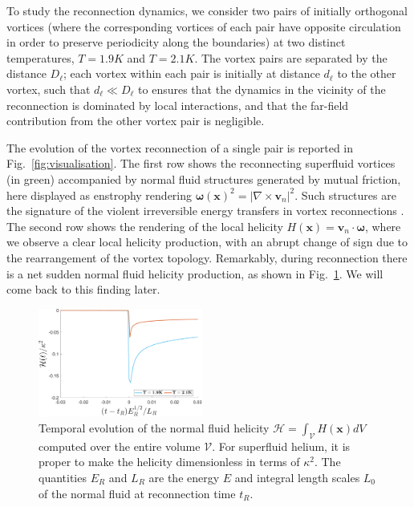 \documentclass[%
 reprint,
 amsmath,amssymb,
 aps,
 prl,
]{revtex4-2}
\newcommand{\bom}{\boldsymbol{\omega}}
\def \v{\mathbf{v}}
\def \x{\mathbf{x}}
\begin{document}
{To study the reconnection dynamics, we consider two pairs of initially orthogonal vortices (where the corresponding vortices of each pair have opposite circulation in order to preserve periodicity along the boundaries)
at two distinct temperatures, $T=1.9K$ and $T=2.1K$. The vortex pairs are separated by the distance $D_{\ell}$; each vortex within each pair is initially at distance $d_{\ell}$ to the other vortex, such that $d_{\ell}\ll D_{\ell}$ to ensures that the dynamics in the vicinity of the reconnection is dominated by local interactions, and that the far-field contribution from the other vortex pair is negligible.

The evolution of the vortex reconnection of a single pair is reported in Fig.~\ref{fig:visualisation}. 
The first row shows the reconnecting superfluid vortices (in green) accompanied by normal fluid structures generated by mutual friction, here displayed as enstrophy rendering $\bom(\x)^2=|\nabla\times \v_n|^2$. Such structures are the signature of the violent irreversible energy transfers in vortex reconnections 
\cite{stasiak2024quantum}. The second row shows the rendering of the local helicity $H(\x)=\v_n\cdot\bom$, where we observe a clear local helicity production, with an abrupt change of sign due to the rearrangement of the vortex topology. Remarkably, during reconnection there is a net 
sudden normal fluid helicity production, as shown in Fig.~\ref{fig:total-helicity}. We will come back to this finding later.
\begin{figure}[t]
    \centering
    \includegraphics*[width=0.48\textwidth]{helicity_total}
\caption{Temporal evolution of the normal fluid helicity $\mathcal{H} = \int_{\mathcal{V}}H(\x)dV$ computed over the entire volume $\mathcal{V}$. For superfluid helium, it is proper to make the helicity dimensionless in terms of $\kappa^2$. The quantities $E_R$ and $L_R$ are the energy $E$ and integral length scales $L_0$ of the normal fluid at reconnection time $t_R$.}
\label{fig:total-helicity}
\end{figure}

}
\end{document}
